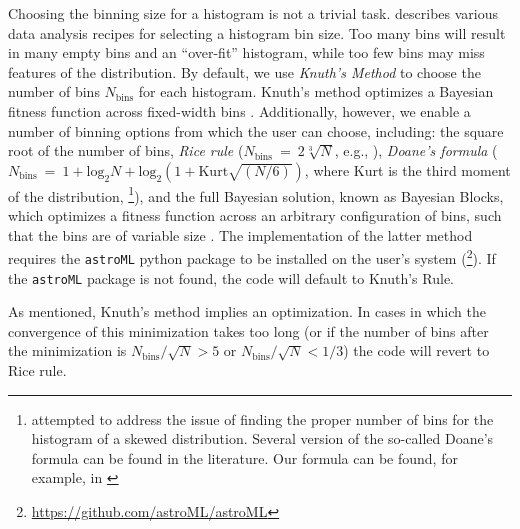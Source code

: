 \documentclass{emulateapj}
\begin{document}
Choosing the binning size for a histogram is not a trivial task.  \citet{hogg08} describes various data analysis recipes for selecting a histogram bin size. Too many bins will result in many empty bins and an ``over-fit'' histogram, while too few bins may miss features of the distribution. 
By default, we use \emph{Knuth's Method} to choose the number of bins $N_\mathrm{bins}$ for each histogram. Knuth's method  optimizes  a Bayesian fitness function across fixed-width bins \citep{knuth06}. Additionally, however, we enable a number of binning options from which the user can choose, including: 
the square root of the number of bins, \emph{Rice rule} ($N_\mathrm{bins}~=~2\sqrt[3]{N}$, e.g., \citealt{hastie09}), 
\emph{Doane's formula} ($N_\mathrm{bins}~=~1 + \mathrm{log}_2{N} + \mathrm{log}_2\left(1 + \mathrm{Kurt}\sqrt{(N / 6)}\right)$, where Kurt is the third moment of the distribution, \citealt{doane76}\footnote{\citet{doane76} attempted to address the issue of finding the proper number of bins for the histogram of a skewed distribution. Several version of the so-called Doane's formula can be found in the literature. Our formula can be found, for example, in \citealt{Pharmacokinetic}}), and the full Bayesian solution, known as Bayesian Blocks, which optimizes a fitness function across an arbitrary configuration of bins, such that the bins are of variable size \citep{scargle13}. The implementation of the latter method requires the \verb=astroML= python package to be installed on the user's system (\citealt{astroml}\footnote{\url{https://github.com/astroML/astroML}}). If the \verb=astroML= package is not found, the code will default to Knuth's Rule. 

As mentioned, Knuth's method implies an optimization. In cases in which the convergence of this minimization takes too long (or if the number of bins after the minimization is  $N_\mathrm{bins}/\sqrt{N} > 5$ or $N_\mathrm{bins}/\sqrt{N} < 1/3$) the code will revert to Rice rule.
\end{document}
